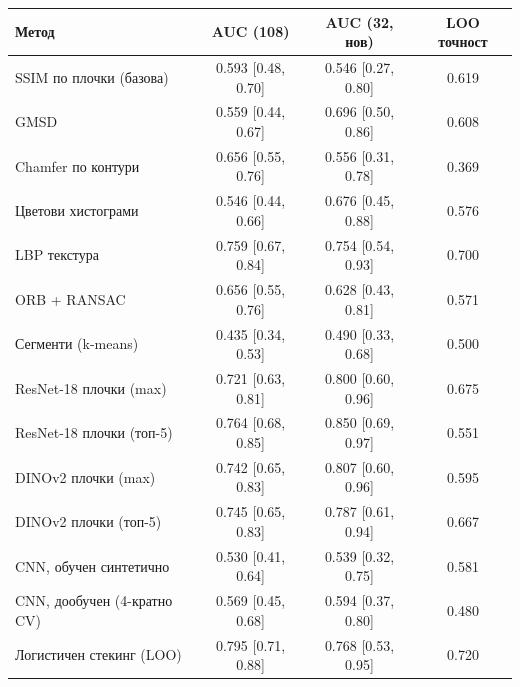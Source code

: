 \begin{tabular}{lccc}
\hline
Метод & AUC (108) & AUC (32, нов) & LOO точност \\
\hline
SSIM по плочки (базова) & 0.593 [0.48, 0.70] & 0.546 [0.27, 0.80] & 0.619 \\
GMSD & 0.559 [0.44, 0.67] & 0.696 [0.50, 0.86] & 0.608 \\
Chamfer по контури & 0.656 [0.55, 0.76] & 0.556 [0.31, 0.78] & 0.369 \\
Цветови хистограми & 0.546 [0.44, 0.66] & 0.676 [0.45, 0.88] & 0.576 \\
LBP текстура & 0.759 [0.67, 0.84] & 0.754 [0.54, 0.93] & 0.700 \\
ORB + RANSAC & 0.656 [0.55, 0.76] & 0.628 [0.43, 0.81] & 0.571 \\
Сегменти (k-means) & 0.435 [0.34, 0.53] & 0.490 [0.33, 0.68] & 0.500 \\
ResNet-18 плочки (max) & 0.721 [0.63, 0.81] & 0.800 [0.60, 0.96] & 0.675 \\
ResNet-18 плочки (топ-5) & 0.764 [0.68, 0.85] & 0.850 [0.69, 0.97] & 0.551 \\
DINOv2 плочки (max) & 0.742 [0.65, 0.83] & 0.807 [0.60, 0.96] & 0.595 \\
DINOv2 плочки (топ-5) & 0.745 [0.65, 0.83] & 0.787 [0.61, 0.94] & 0.667 \\
CNN, обучен синтетично & 0.530 [0.41, 0.64] & 0.539 [0.32, 0.75] & 0.581 \\
CNN, дообучен (4-кратно CV) & 0.569 [0.45, 0.68] & 0.594 [0.37, 0.80] & 0.480 \\
Логистичен стекинг (LOO) & 0.795 [0.71, 0.88] & 0.768 [0.53, 0.95] & 0.720 \\
\hline
\end{tabular}
